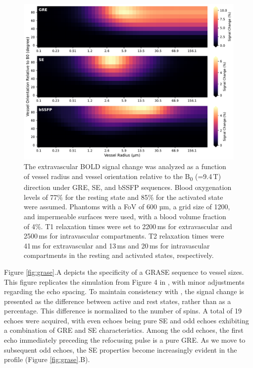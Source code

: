 \begin{figure}[!htbp]
    \centering
    \includegraphics[width=\textwidth]{fig4_orientation.pdf}
    \caption{The extravascular BOLD signal change was analyzed as a function of vessel radius and vessel orientation relative to the B\textsubscript{0} (=9.4\,T) direction under GRE, SE, and bSSFP sequences. Blood oxygenation levels of 77\% for the resting state and 85\% for the activated state were assumed. Phantoms with a FoV of 600 µm, a grid size of 1200, and impermeable surfaces were used, with a blood volume fraction of 4\%. T1 relaxation times were set to 2200\,ms for extravascular and 2500\,ms for intravascular compartments. T2 relaxation times were 41\,ms for extravascular and 13\,ms and 20\,ms for intravascular compartments in the resting and activated states, respectively.}
    \label{fig:orientation}
\end{figure}

Figure \ref{fig:grase}.A depicts the specificity of a GRASE sequence to vessel sizes. This figure replicates the simulation from Figure 4 in \cite{scheffler2021bold}, with minor adjustments regarding the echo spacing. To maintain consistency with \cite{scheffler2021bold}, the signal change is presented as the difference between active and rest states, rather than as a percentage. This difference is normalized to the number of spins. A total of 19 echoes were acquired, with even echoes being pure SE and odd echoes exhibiting a combination of GRE and SE characteristics. Among the odd echoes, the first echo immediately preceding the refocusing pulse is a pure GRE. As we move to subsequent odd echoes, the SE properties become increasingly evident in the profile (Figure \ref{fig:grase}.B).

